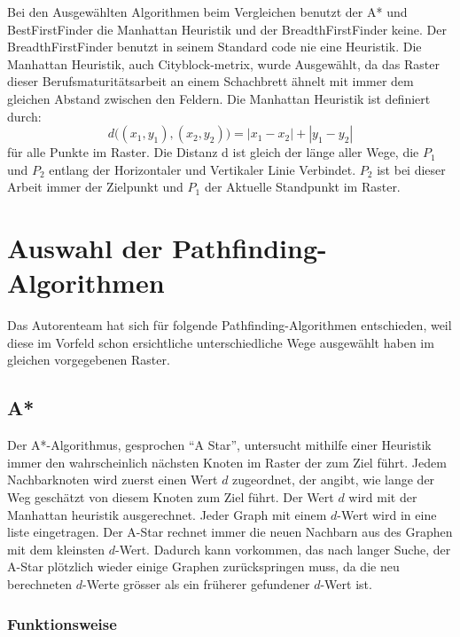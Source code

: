 Bei den Ausgewählten Algorithmen beim Vergleichen benutzt der A* und
BestFirstFinder die Manhattan Heuristik und der BreadthFirstFinder
keine. Der BreadthFirstFinder benutzt in seinem Standard code nie eine
Heuristik. Die Manhattan Heuristik, auch Cityblock-metrix, wurde
Ausgewählt, da das Raster dieser Berufsmaturitätsarbeit an einem Schachbrett
ähnelt mit immer dem gleichen Abstand zwischen den Feldern.
Die Manhattan Heuristik ist definiert durch:
\begin{equation}
d\big((x_1,y_1),(x_2,y_2)\big) = |x_1 - x_{2}| + |y_{1} - y_{2}|
\end{equation}
für alle Punkte im Raster. Die Distanz d ist gleich der länge aller Wege, die $P_1$ und $P_2$ entlang der Horizontaler und Vertikaler Linie Verbindet. $P_2$ ist bei dieser Arbeit immer der Zielpunkt und $P_1$ der
Aktuelle Standpunkt im Raster. \cite[Patel, 2019]{heuristicsredblob}

\section{Auswahl der Pathfinding-Algorithmen}

Das Autorenteam hat sich für folgende Pathfinding-Algorithmen
entschieden, weil diese im Vorfeld schon ersichtliche unterschiedliche
Wege ausgewählt haben im gleichen vorgegebenen Raster.

\subsection{A*}

Der A*-Algorithmus, gesprochen ``A Star'', untersucht mithilfe einer
Heuristik immer den wahrscheinlich nächsten Knoten im Raster der zum
Ziel führt. Jedem Nachbarknoten wird zuerst einen Wert $d$ zugeordnet, der
angibt, wie lange der Weg geschätzt von diesem Knoten zum Ziel führt. Der Wert $d$
wird mit der Manhattan heuristik ausgerechnet. Jeder Graph mit einem $d$-Wert 
wird in eine liste eingetragen. Der A-Star rechnet immer die neuen
Nachbarn aus des Graphen mit dem kleinsten $d$-Wert. Dadurch kann
vorkommen, das nach langer Suche, der A-Star plötzlich wieder einige
Graphen zurückspringen muss, da die neu berechneten $d$-Werte grösser als
ein früherer gefundener $d$-Wert ist.
\cite[Schmidt, Fuchs]{asterngeo}

\subsubsection{Funktionsweise}

